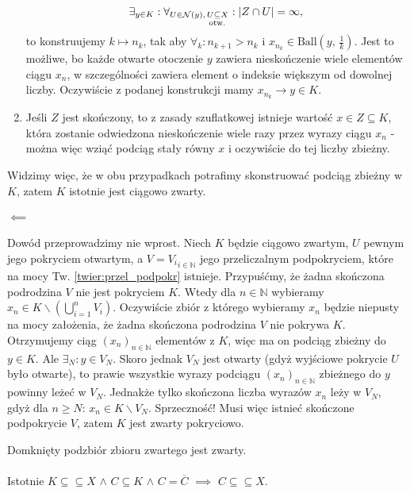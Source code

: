 \documentclass{article}
\numberwithin{defi}{section}
\numberwithin{defi}{section}
\newcommand{\N}{\mathbb{N}}
\newcommand{\oo}{\infty}
\newcommand{\Nau}{\mathcal{N}}
\newcommand{\subotw}{\underset{\clap{\scriptsize otw.}}{\subseteq}}
\providecommand{\ol}{\overline}
\newcommand{\ciag}[1]{(#1_{n})_{n \in \N}}
\newcommand{\ball}[2]{\text{Ball}(#1, \, #2)}
\begin{document}
\begin{dow}
\begin{enumerate}
\begin{equation*}
                \exists_{y \in K}: \forall_{U \in \Nau(y), \, U \subotw X}: | Z \cap U | = \oo,
            \end{equation*} to konstruujemy $k \mapsto n_k$, tak aby $\forall_k: n_{k+1} > n_k$ i $x_{n_k} \in \ball{y}{\frac{1}{k}}$. Jest to możliwe, bo każde otwarte otoczenie $y$ zawiera nieskończenie wiele elementów ciągu $x_n$, w szczególności zawiera element o indeksie większym od dowolnej liczby. Oczywiście z podanej konstrukcji mamy $x_{n_k} \to y \in K$.
            \item Jeśli $Z$ jest skończony, to z zasady szuflatkowej istnieje wartość $x \in Z \subseteq K$, która zostanie odwiedzona nieskończenie wiele razy przez wyrazy ciągu $x_n$ - można więc wziąć podciąg stały równy $x$ i oczywiście do tej liczby zbieżny.
        \end{enumerate} Widzimy więc, że w obu przypadkach potrafimy skonstruować podciąg zbieżny w $K$, zatem $K$ istotnie jest ciągowo zwarty.
        
        \paragraph{$\impliedby$} Dowód przeprowadzimy nie wprost. Niech $K$ będzie ciągowo zwartym, $U$ pewnym jego pokryciem otwartym, a $V = {V_i}_{i \in \N}$ jego przeliczalnym podpokryciem, które na mocy Tw. \ref{twier:przel_podpokr} istnieje. Przypuśćmy, że żadna skończona podrodzina $V$ nie jest pokryciem $K$. Wtedy dla $n \in \N$ wybieramy $x_n \in K \backslash (\bigcup_{i=1}^{n}V_i)$. Oczywiście zbiór z którego wybieramy $x_n$ będzie niepusty na mocy założenia, że żadna skończona podrodzina $V$ nie pokrywa $K$. Otrzymujemy ciąg $\ciag{x}$ elementów z $K$, więc ma on podciąg zbieżny do $y \in K$. Ale $\exists_{N}: y \in V_N$. Skoro jednak $V_N$ jest otwarty (gdyż wyjściowe pokrycie $U$ było otwarte), to prawie wszystkie wyrazy podciągu $\ciag{x}$ zbieżnego do $y$ powinny leżeć w $V_N$. Jednakże tylko skończona liczba wyrazów $x_n$ leży w $V_N$, gdyż dla $n \geqslant N$: $x_n \in K \backslash V_N$. Sprzeczność! Musi więc istnieć skończone podpokrycie $V$, zatem $K$ jest zwarty pokryciowo.  


    \end{dow}

    \begin{obs}{} \label{obs:domk-podzb-zwar}
        Domknięty podzbiór zbioru zwartego jest zwarty.
    \end{obs}
    \paragraph*{} Istotnie $K \subseteq \subseteq X$ $\wedge$ $C \subseteq K$ $\wedge$ $C = \ol{C}$ $\implies$ $C \subseteq \subseteq X$.
\end{document}
